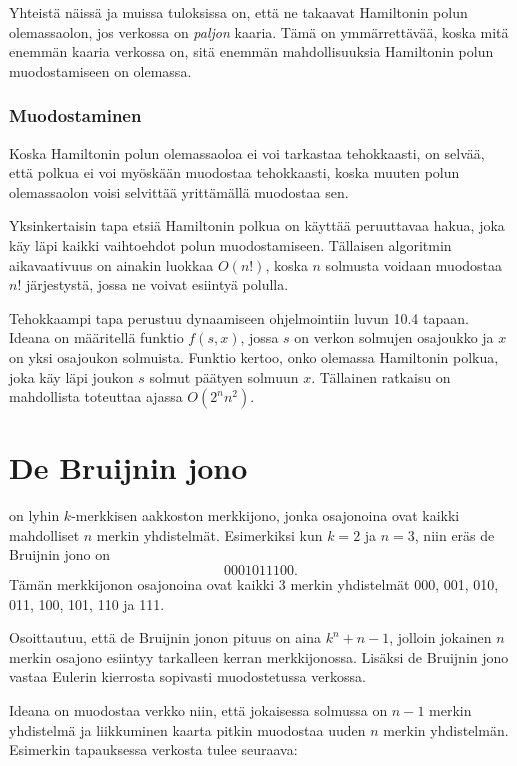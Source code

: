 Yhteistä näissä ja muissa tuloksissa on,
että ne takaavat Hamiltonin polun olemassaolon,
jos verkossa on \textit{paljon} kaaria.
Tämä on ymmärrettävää, koska mitä enemmän
kaaria verkossa on, sitä enemmän mahdollisuuksia
Hamiltonin polun muodostamiseen on olemassa.

\subsubsection{Muodostaminen}

Koska Hamiltonin polun olemassaoloa ei voi tarkastaa tehokkaasti,
on selvää, että polkua ei voi myöskään muodostaa tehokkaasti,
koska muuten polun olemassaolon voisi selvittää yrittämällä
muodostaa sen.

Yksinkertaisin tapa etsiä Hamiltonin polkua on käyttää
peruuttavaa hakua, joka käy läpi kaikki vaihtoehdot
polun muodostamiseen.
Tällaisen algoritmin aikavaativuus on ainakin luokkaa $O(n!)$,
koska $n$ solmusta voidaan muodostaa $n!$ järjestystä,
jossa ne voivat esiintyä polulla.

Tehokkaampi tapa perustuu dynaamiseen ohjelmointiin
luvun 10.4 tapaan.
Ideana on määritellä funktio $f(s,x)$,
jossa $s$ on verkon solmujen osajoukko ja
$x$ on yksi osajoukon solmuista.
Funktio kertoo, onko olemassa Hamiltonin polkua,
joka käy läpi joukon $s$ solmut päätyen solmuun $x$.
Tällainen ratkaisu on mahdollista toteuttaa ajassa $O(2^n n^2)$.

\section{De Bruijnin jono}


on lyhin $k$-merkkisen aakkoston merkkijono,
jonka osajonoina ovat kaikki mahdolliset
$n$ merkin yhdistelmät.
Esimerkiksi kun $k=2$ ja $n=3$,
niin eräs de Bruijnin jono on
\[0001011100.\]
Tämän merkkijonon osajonoina ovat kaikki 3 merkin yhdistelmät
000, 001, 010, 011, 100, 101, 110 ja 111.

Osoittautuu, että de Bruijnin jonon
pituus on aina $k^n+n-1$, jolloin jokainen
$n$ merkin osajono esiintyy tarkalleen
kerran merkkijonossa.
Lisäksi de Bruijnin jono
vastaa Eulerin kierrosta sopivasti
muodostetussa verkossa.

Ideana on muodostaa verkko niin,
että jokaisessa solmussa on $n-1$
merkin yhdistelmä ja liikkuminen
kaarta pitkin muodostaa uuden
$n$ merkin yhdistelmän.
Esimerkin tapauksessa verkosta tulee seuraava:

